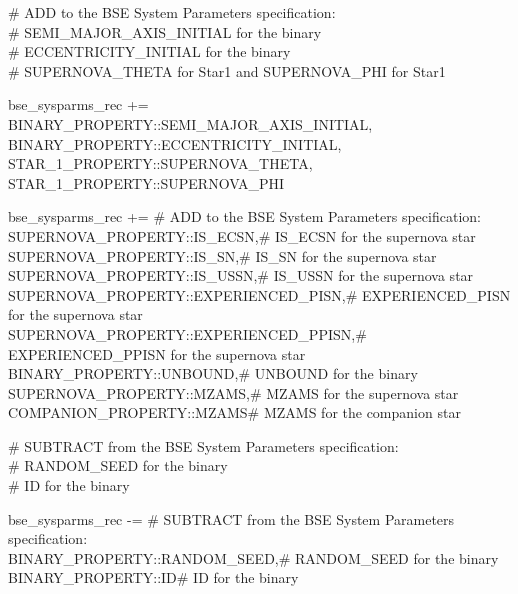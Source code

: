 \# ADD to the BSE System Parameters specification: \\
\# SEMI\_MAJOR\_AXIS\_INITIAL for the binary \\
\# ECCENTRICITY\_INITIAL for the binary \\
\# SUPERNOVA\_THETA for Star1 and SUPERNOVA\_PHI for Star1

\newpage
\small
bse\_sysparms\_rec += \lcb \\
\tabto{1.75em}BINARY\_PROPERTY::SEMI\_MAJOR\_AXIS\_INITIAL, \\
\tabto{1.75em}BINARY\_PROPERTY::ECCENTRICITY\_INITIAL, \\
\tabto{1.75em}STAR\_1\_PROPERTY::SUPERNOVA\_THETA, STAR\_1\_PROPERTY::SUPERNOVA\_PHI \\
\rcb
\normalsize

\small
bse\_sysparms\_rec += \lcb\tabto{27em}\# ADD to the BSE System Parameters specification: \\
\tabto{1.75em}SUPERNOVA\_PROPERTY::IS\_ECSN,\tabto{27em}\# IS\_ECSN for the supernova star \\
\tabto{1.75em}SUPERNOVA\_PROPERTY::IS\_SN,\tabto{27em}\# IS\_SN for the supernova star \\
\tabto{1.75em}SUPERNOVA\_PROPERTY::IS\_USSN,\tabto{27em}\# IS\_USSN for the supernova star \\
\tabto{1.75em}SUPERNOVA\_PROPERTY::EXPERIENCED\_PISN,\tabto{27em}\# EXPERIENCED\_PISN for the supernova star \\
\tabto{1.75em}SUPERNOVA\_PROPERTY::EXPERIENCED\_PPISN,\tabto{27em}\# EXPERIENCED\_PPISN for the supernova star \\
\tabto{1.75em}BINARY\_PROPERTY::UNBOUND,\tabto{27em}\# UNBOUND for the binary \\
\tabto{1.75em}SUPERNOVA\_PROPERTY::MZAMS,\tabto{27em}\# MZAMS for the supernova star \\    \tabto{1.75em}COMPANION\_PROPERTY::MZAMS\tabto{27em}\# MZAMS for the companion star \\
\rcb                      
\normalsize

\# SUBTRACT from the BSE System Parameters specification: \\
\# RANDOM\_SEED for the binary \\
\# ID for the binary

\small
bse\_sysparms\_rec -= \lcb\tabto{22em}\# SUBTRACT from the BSE System Parameters specification: \\
\tabto{1.75em}BINARY\_PROPERTY::RANDOM\_SEED,\tabto{22em}\# RANDOM\_SEED for the binary \\  \tabto{1.75em}BINARY\_PROPERTY::ID\tabto{22em}\# ID for the binary \\
\rcb
\normalsize

